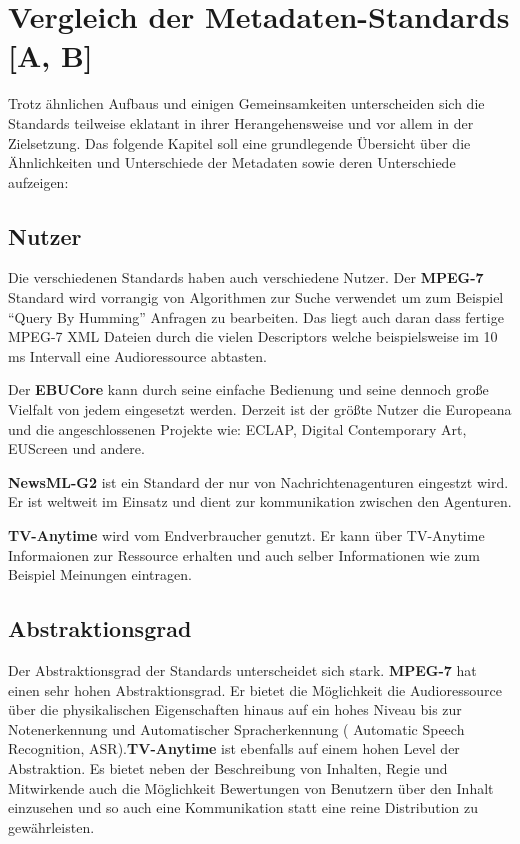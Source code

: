	\section{Vergleich der Metadaten-Standards \hfill [A, B]}
	Trotz ähnlichen Aufbaus und einigen Gemeinsamkeiten unterscheiden sich die Standards teilweise eklatant in ihrer Herangehensweise und vor allem in der Zielsetzung. Das folgende Kapitel soll eine grundlegende Übersicht über die Ähnlichkeiten und Unterschiede der Metadaten sowie deren Unterschiede aufzeigen:
	
	\subsection{Nutzer}
	Die verschiedenen Standards haben auch verschiedene Nutzer. Der \textbf{MPEG-7} Standard wird vorrangig von Algorithmen zur Suche verwendet um zum Beispiel \enquote{Query By Humming} Anfragen zu bearbeiten. Das liegt auch daran dass fertige MPEG-7 XML Dateien durch die vielen Descriptors welche beispielsweise im 10 ms Intervall eine Audioressource abtasten.
	
	Der \textbf{EBUCore} kann durch seine einfache Bedienung und seine dennoch große Vielfalt von jedem eingesetzt werden. Derzeit ist der größte Nutzer die Europeana und die angeschlossenen Projekte wie: ECLAP, Digital Contemporary Art, EUScreen und andere.
	
	\textbf{NewsML-G2} ist ein Standard der nur von Nachrichtenagenturen eingestzt wird. Er ist weltweit im Einsatz und dient zur kommunikation zwischen den Agenturen.
	
	\textbf{TV-Anytime} wird vom Endverbraucher genutzt. Er kann über TV-Anytime Informaionen zur Ressource erhalten und auch selber Informationen wie zum Beispiel Meinungen eintragen.

	\subsection{Abstraktionsgrad}
Der Abstraktionsgrad der Standards unterscheidet sich stark. \textbf{MPEG-7} hat einen sehr hohen Abstraktionsgrad. Er bietet die Möglichkeit die Audioressource über die physikalischen Eigenschaften hinaus auf ein hohes Niveau bis zur Notenerkennung und Automatischer Spracherkennung ( Automatic Speech Recognition, ASR).\textbf{TV-Anytime} ist ebenfalls auf einem hohen Level der Abstraktion. Es bietet neben der Beschreibung von Inhalten, Regie und Mitwirkende auch die Möglichkeit Bewertungen von Benutzern über den Inhalt einzusehen und so auch eine Kommunikation statt eine reine Distribution zu gewährleisten.

